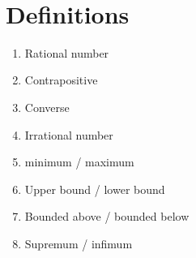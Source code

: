 \documentclass[12pt]{amsart}
\begin{document}

\

\section*{Definitions}

\begin{enumerate}
	\item Rational number
	\item Contrapositive
	\item Converse
	\item Irrational number
	\item minimum / maximum
	\item Upper bound / lower bound
	\item Bounded above / bounded below
	\item Supremum / infimum
	\begin{comment}
	\item Absolute value
	\item (sequence) converges to $L$

	\item (sequence) is convergent
	\item (sequence) is divergent

	\item increasing / decreasing sequence
	\item strictly increasing / decreasing sequence
	\item monotone sequence
	\item diverges to $\infty$ or $-\infty$				
	\item Subsequence
	

	\item Cauchy sequence

	\item Limit of a function

	\item Continuous at a point
				\item Continuous on an open interval
	\item Continuous on a closed interval
	
	\item Differentiable
	\item Derivative (at a point)
	\item Derivative (function)
		\item Increasing/decreasing function
\end{comment}
\end{enumerate}
\end{document}
